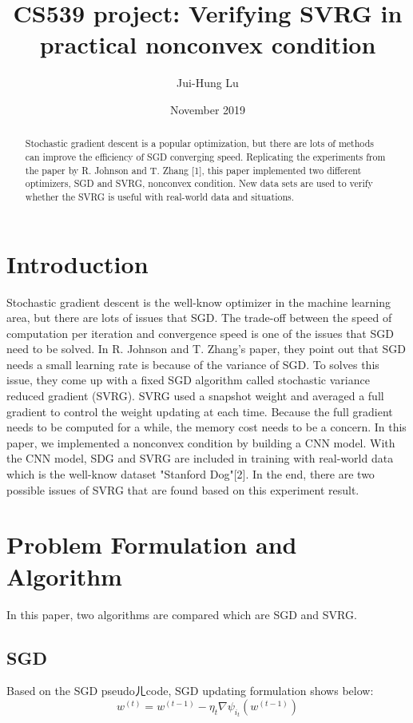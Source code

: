 \documentclass{article}
\title{CS539 project: Verifying SVRG in practical nonconvex condition}
\author{Jui-Hung Lu }
\date{November 2019}
\begin{document}
\maketitle

\begin{abstract}
Stochastic gradient descent is a popular optimization, but there are lots of methods can improve the efficiency of SGD converging speed. Replicating the experiments from the paper by R. Johnson and T. Zhang [1], this paper implemented two different optimizers, SGD and SVRG, nonconvex condition. New data sets are used to verify whether the SVRG is useful with real-world data and situations.
\end{abstract}

\section{Introduction}
Stochastic gradient descent is the well-know optimizer in the machine learning area, but there are lots of issues that SGD. The trade-off between the speed of computation per iteration and convergence speed is one of the issues that SGD need to be solved. In R. Johnson and T. Zhang's paper, they point out that SGD needs a small learning rate is because of the variance of SGD. To solves this issue, they come up with a fixed SGD algorithm called stochastic variance reduced gradient (SVRG). SVRG used a snapshot weight and averaged a full gradient to control the weight updating at each time. Because the full gradient needs to be computed for a while, the memory cost needs to be a concern.
In this paper, we implemented a nonconvex condition by building a CNN model. With the CNN model, SDG and SVRG are included in training with real-world data which is the well-know dataset "Stanford Dog"[2]. In the end, there are two possible issues of SVRG that are found based on this experiment result.

\section{Problem Formulation and Algorithm}
In this paper, two algorithms are compared which are SGD and SVRG.
\subsection{SGD}
Based on the SGD pseudoㄦcode, SGD updating formulation shows below:
\[w^{(t)}=w^{(t-1)}-\eta_{t}\nabla\psi_{i_{t}}(w^{(t-1)}) \tag{1}\label{1}\]
\end{document}
